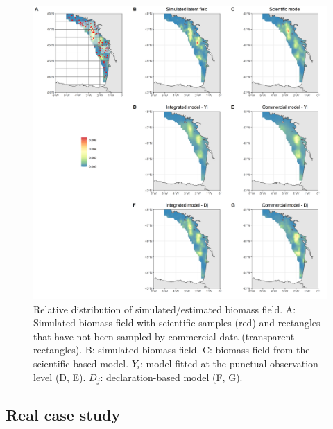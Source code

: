 \documentclass[
  english,
  man]{apa6}
\begin{document}
\begin{figure}
\centering
\includegraphics{images/Map_multi_square.png}
\caption{\label{fig:MapSeveral} Relative distribution of simulated/estimated biomass field. A: Simulated biomass field with scientific samples (red) and rectangles that have not been sampled by commercial data (transparent rectangles). B: simulated biomass field. C: biomass field from the scientific-based model. \(Y_i\): model fitted at the punctual observation level (D, E). \(D_j\): declaration-based model (F, G).}
\end{figure}

\hypertarget{real-case-study}{%
\subsection{Real case study}\label{real-case-study}}
\end{document}
